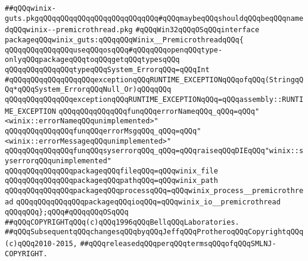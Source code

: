 \label{src/lib/std/src/win32/winix-guts.pkg}
\verb|##qQQqwinix-guts.pkgqQQqqQQqqQQqqQQqqQQqqQQqqQQq#qQQqmaybeqQQqshouldqQQqbeqQQqnamedqQQqwinix--premicrothread.pkg|\newline
\newline
\verb|#qQQqWin32qQQqOSqQQqinterface|\newline
\newline
\verb|packageqQQqwinix_guts:qQQqqQQqWinix__PremicrothreadqQQq{|\newline
\newline
\verb|qQQqqQQqqQQqqQQquseqQQqosqQQq#qQQqqQQqopenqQQqtype-onlyqQQqpackageqQQqtoqQQqgetqQQqtypesqQQq|\newline
\newline
\verb|qQQqqQQqqQQqqQQqtypeqQQqSystem_ErrorqQQq=qQQqInt|\newline
\newline
\verb|#qQQqqQQqqQQqqQQqqQQqexceptionqQQqRUNTIME_EXCEPTIONqQQqofqQQq(StringqQQq*qQQqSystem_ErrorqQQqNull_Or)qQQqqQQq|\newline
\verb|qQQqqQQqqQQqqQQqexceptionqQQqRUNTIME_EXCEPTIONqQQq=qQQqassembly::RUNTIME_EXCEPTION|\newline
\newline
\verb|qQQqqQQqqQQqqQQqfunqQQqerrorNameqQQq_qQQq=qQQq"<winix::errorNameqQQqunimplemented>"|\newline
\verb|qQQqqQQqqQQqqQQqfunqQQqerrorMsgqQQq_qQQq=qQQq"<winix::errorMessageqQQqunimplemented>"|\newline
\verb|qQQqqQQqqQQqqQQqfunqQQqsyserrorqQQq_qQQq=qQQqraiseqQQqDIEqQQq"winix::syserrorqQQqunimplemented"|\newline
\newline
\verb|qQQqqQQqqQQqqQQqpackageqQQqfileqQQq=qQQqwinix_file|\newline
\verb|qQQqqQQqqQQqqQQqpackageqQQqpathqQQq=qQQqwinix_path|\newline
\verb|qQQqqQQqqQQqqQQqpackageqQQqprocessqQQq=qQQqwinix_process__premicrothread|\newline
\verb|qQQqqQQqqQQqqQQqpackageqQQqioqQQq=qQQqwinix_io__premicrothread|\newline
\newline
\verb|qQQqqQQq};qQQq#qQQqqQQqOSqQQq|\newline
\newline
\newline
\newline
\verb|##qQQqCOPYRIGHTqQQq(c)qQQq1996qQQqBellqQQqLaboratories.|\newline
\verb|##qQQqSubsequentqQQqchangesqQQqbyqQQqJeffqQQqProtheroqQQqCopyrightqQQq(c)qQQq2010-2015,|\newline
\verb|##qQQqreleasedqQQqperqQQqtermsqQQqofqQQqSMLNJ-COPYRIGHT.|\newline

